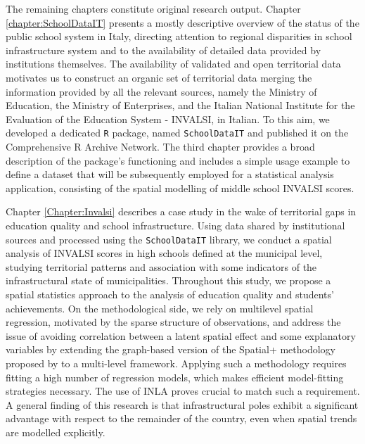 \documentclass[openany, 11pt, oneside]{book}
\begin{document}
The remaining chapters constitute original research output. Chapter \ref{chapter:SchoolDataIT} presents a mostly descriptive overview of the status of the public school system in Italy, directing attention to regional disparities in school infrastructure system and to the availability of detailed data provided by institutions themselves. The availability of validated and open territorial data motivates us to construct an organic set of territorial data merging the information provided by all the relevant sources, namely the Ministry of Education, the Ministry of Enterprises, and the Italian National Institute for the Evaluation of the Education System - INVALSI, in Italian. To this aim, we developed a dedicated \texttt{R} package, named \texttt{SchoolDataIT} and published it on the Comprehensive R Archive Network. The third chapter provides a broad description of the package's functioning and includes a simple usage example to define a dataset that will be subsequently employed for a statistical analysis application, consisting of the spatial modelling of middle school INVALSI scores.

Chapter \ref{Chapter:Invalsi} describes a case study in the wake of territorial gaps in education quality and school infrastructure. Using data shared by institutional sources and processed using the \texttt{SchoolDataIT} library, we conduct a spatial analysis of INVALSI scores in high schools defined at the municipal level, studying territorial patterns and association with some indicators of the infrastructural state of municipalities. Throughout this study, we propose a spatial statistics approach to the analysis of education quality and students' achievements. On the methodological side, we rely on multilevel spatial regression, motivated by the sparse structure of observations, and address the issue of avoiding correlation between a latent spatial effect and some explanatory variables by extending the graph-based version of the Spatial+ methodology \parencite{Dupont} proposed by \cite{Urdangarin24} to a multi-level framework. Applying such a methodology requires fitting a high number of regression models, which makes efficient model-fitting strategies necessary. The use of INLA proves crucial to match such a requirement. A general finding of this research is that infrastructural poles exhibit a significant advantage with respect to the remainder of the country, even when spatial trends are modelled explicitly.
\end{document}
